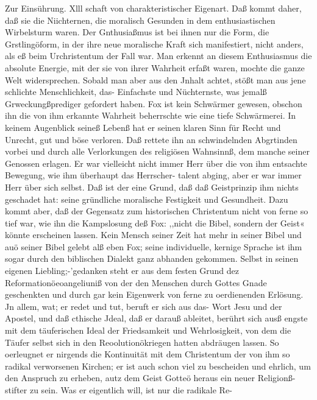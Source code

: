 Zur Einsührung. Xlll
schaft von charakteristischer Eigenart. Daß kommt daher, daß sie
die Niichternen, die moralisch Gesunden in dem enthusiastischen
Wirbelsturm waren. Der Gnthusiaßmus ist bei ihnen nur die
Form, die Grstlingöform, in der ihre neue moralische Kraft sich
manifestiert, nicht anders, als eß beim Urchristentum der Fall war.
Man erkennt an diesem Enthusiasmus die absolute Energie, mit
der sie von ihrer Wahrheit erfaßt waren, mochte die ganze Welt
widersprechen. Sobald man aber aus den Jnhalt achtet, stößt man
aus jene schlichte Menschlichkeit, das- Einfachste und Nüchternste, was
jemalß Grweckungßprediger gefordert haben. Fox ist kein Schwärmer
gewesen, obschon ihn die von ihm erkannte Wahrheit beherrschte
wie eine tiefe Schwärmerei. In keinem Augenblick seineß Lebenß
hat er seinen klaren Sinn für Recht und Unrecht, gut und böse
verloren. Daß rettete ihn an schwindelnden Abgrtinden vorbei
und durch alle Verlorkungen des religiösen Wahnsinnß, dem manche
seiner Genossen erlagen. Er war vielleicht nicht immer Herr über
die von ihm entsachte Bewegung, wie ihm überhaupt das Herrscher-
talent abging, aber er war immer Herr über sich selbst. Daß
ist der eine Grund, daß daß Geistprinzip ihm nichts geschadet
hat: seine gründliche moralische Festigkeit und Gesundheit. Dazu
kommt aber, daß der Gegensatz zum historischen Christentum nicht
von ferne so tief war, wie ihn die Kampslosung deß Fox: ,,nicht
die Bibel, sondern der Geist« könnte erscheinen lassen. Kein
Mensch seiner Zeit hat mehr in seiner Bibel und auö seiner
Bibel gelebt alß eben Fox; seine individuelle, kernige Sprache ist
ihm sogar durch den biblischen Dialekt ganz abhanden gekommen.
Selbst in seinen eigenen Liebling;-’gedanken steht er aus dem festen
Grund dez Reformationöeoangeliuniß von der den Menschen
durch Gottes Gnade geschenkten und durch gar kein Eigenwerk
von ferne zu oerdienenden Erlösung. Jn allem, wat; er redet und
tut, beruft er sich aus das- Wort Jesu und der Apostel, und daß
cthische Jdeal, daß er darauß ableitet, berührt sich ausß engste
mit dem täuferischen Ideal der Friedsamkeit und Wehrlosigkeit,
von dem die Täufer selbst sich in den Reoolutionökriegen hatten
abdräugen lassen. So oerleugnet er nirgends die Kontinuität
mit dem Christentum der von ihm so radikal verworsenen Kirchen;
er ist auch schon viel zu bescheiden und ehrlich, um den Anspruch
zu erheben, autz dem Geist Gotteö heraus ein neuer Religionß-
stifter zu sein. Was er eigentlich will, ist nur die radikale Re-


